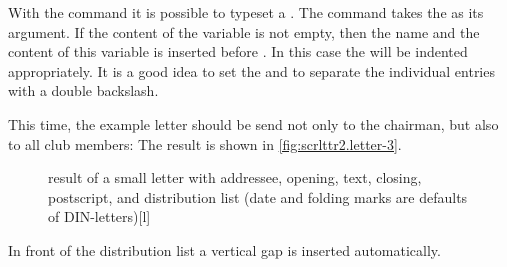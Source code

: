 \begin{Declaration}
\end{Declaration}
With the command %
 it is
possible to typeset a .  The command takes the
 as its argument. If the content of the variable
 is not empty, then
the name and the content of this variable is inserted before
.  In this case the  will be
indented appropriately.  It is a good idea to set the
  and to
separate the individual entries with a double backslash.
\begin{Example}
  This time, the example letter should be send not only to the chairman, but
  also to all club members:
  The result is shown in \autoref{fig:scrlttr2.letter-3}.
  \begin{figure}
    \setcapindent{0pt}%
    \begin{captionbeside}{%
        result of a small letter with addressee, opening, text, closing,
        postscript, and distribution list
        (date and folding marks are defaults of DIN-letters)}[l]
    \end{captionbeside}
    \label{fig:scrlttr2.letter-3}
  \end{figure}
\end{Example}
In front of the distribution list a vertical gap is inserted automatically.%
%
\EndIndexGroup



